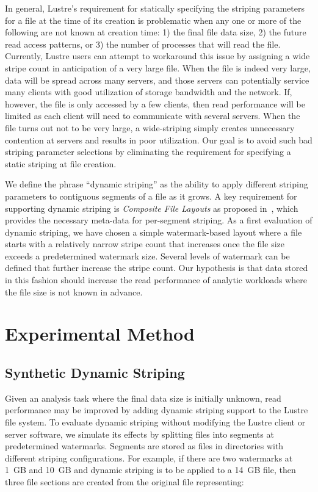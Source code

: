 \documentclass[conference,compsoc]{IEEEtran}
\begin{document}
In general, Lustre's requirement for statically specifying the striping parameters for a file at the time of its creation is problematic when any one or more of the following are not known at creation time: 1) the final file data size, 2) the future read access patterns, or 3) the number of processes that will read the file. Currently, Lustre users can attempt to workaround this issue by assigning a wide stripe count in anticipation of a very large file. When the file is indeed very large, data will be spread across many servers, and those servers can potentially service many clients with good utilization of storage bandwidth and the network. If, however, the file is only accessed by a few clients, then read performance will be limited as each client will need to communicate with several servers. When the file turns out not to be very large, a wide-striping simply creates unnecessary contention at servers and results in poor utilization. Our goal is to avoid such bad striping parameter selections by eliminating the requirement for specifying a static striping at file creation.

We define the phrase ``dynamic striping'' as the ability to apply different striping parameters to contiguous segments of a file as it grows. A key requirement for supporting dynamic striping is \emph{Composite File Layouts} as proposed in~\cite{lfs_composite_layout}, which provides the necessary meta-data for per-segment striping. As a first evaluation of dynamic striping, we have chosen a simple watermark-based layout where a file starts with a relatively narrow stripe count that increases once the file size exceeds a predetermined watermark size. Several levels of watermark can be defined that further increase the stripe count. 
Our hypothesis is that data stored in this fashion should increase the read performance of analytic workloads where the file size is not known in advance.

\section{Experimental Method}

\subsection{Synthetic Dynamic Striping}

Given an analysis task where the final data size is initially unknown, read performance may be improved by adding dynamic striping support to the Lustre file system. 
To evaluate dynamic striping without modifying the Lustre client or server software, we simulate its effects by splitting files into segments at predetermined watermarks. 
Segments are stored as files in directories with different striping configurations. 
For example, if there are two watermarks at 1~GB and 10~GB and dynamic striping is to be applied to a 14~GB file, then three file sections are created from the original file representing:
\end{document}
